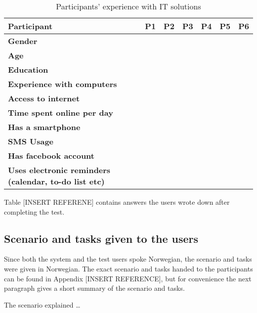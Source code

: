 \begin{sidewaystable}
	\label{tab:participants-table}
	\begin{tabular}{ | p{3.5cm} | p{3.0cm} | p{3.0cm} | p{3.0cm} | p{3.0cm} | p{3.0cm} | p{3.0cm} |}
	\hline
	\textbf{Participant} & P1 & P2 & P3 & P4 & P5 & P6 \\ \hline
	\textbf{Gender} & & & & & & \\ \hline
	\textbf{Age} & & & & & & & \\ \hline
	\textbf{Education} & & & & & & \\ \hline
	\textbf{Experience with computers} & & & & & & \\ \hline
	\textbf{Access to internet} & & & & & & \\ \hline
	\textbf{Time spent online per day} & & & & & & \\ \hline
	\textbf{Has a smartphone} & & & & & & \\ \hline
	\textbf{SMS Usage} & & & & & & \\ \hline
	\textbf{Has facebook account} & & & & & & \\ \hline
	\textbf{Uses electronic reminders (calendar, to-do list etc)} & & & & & & \\ \hline
	\end{tabular}
	\caption{Participants' experience with IT solutions}
\end{sidewaystable}

Table [INSERT REFERENE] contains answers the users wrote down after completing the test.

\subsection{Scenario and tasks given to the users}
Since both the system and the test users spoke Norwegian, the scenario and tasks were given in Norwegian. The exact scenario and tasks handed to the participants can be found in Appendix [INSERT REFERENCE], but for convenience the next paragraph gives a short summary of the scenario and tasks.

The scenario explained \ldots

